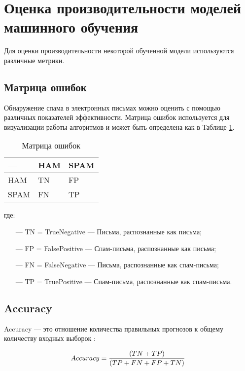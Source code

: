 \section{Оценка производительности моделей машинного обучения}\label{Section:Performance}

Для оценки производительности некоторой обученной модели используются различные метрики.

\subsection{Матрица ошибок}

Обнаружение спама в электронных письмах можно оценить с помощью
различных показателей эффективности. Матрица ошибок используется для
визуализации работы алгоритмов и может быть определена как в Таблице \ref{table1}.

\begin{table}[!ht]
    \centering
    \caption{Матрица ошибок}
    \begin{tabular}{|p{}|p{}|p{}|}
    \hline
        — & HAM & SPAM \\ \hline
        HAM & TN & FP \\ \hline
        SPAM & FN & TP \\ \hline
    \end{tabular}
    \label{table1}
\end{table}
где:

\begin{itemize}
    \item[—] TN = TrueNegative — Письма, распознанные как письма;
    \item[—] FP = FalsePositive — Спам-письма, распознанные как письма;
    \item[—] FN = FalseNegative — Письма, распознанные как спам-письма;
    \item[—] TP = TruePositive — Спам-письма, распознанные как спам-письма.
\end{itemize}


\subsection{Accuracy}

Accuracy — это отношение количества правильных прогнозов к общему количеству входных
выборок \cite{scikitMetrics}:

\begin{equation}\label{eq11}
    Accuracy = {{(TN + TP)} \over{(TP + FN + FP + TN)}}
\end{equation}


